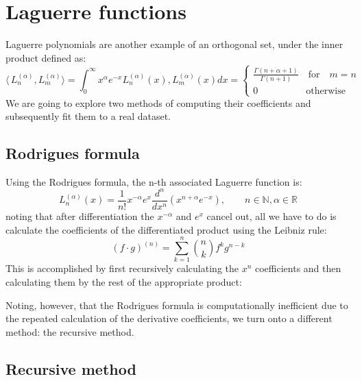 \documentclass[a4paper]{article}
\numberwithin{equation}{section}
\begin{document}
\section{Laguerre functions}

Laguerre polynomials are another example of an orthogonal set, under the inner product defined as:
\begin{equation} \label{laguerre_inner_product}
\langle\,L_n^{(\alpha)}, L_m^{(\alpha)}\rangle=\int_{0}^{\infty} x^{\alpha} e^{-x} L_n^{(\alpha)}(x), L_m^{(\alpha)}(x)dx = 
\begin{cases} 
      \frac{\Gamma(n+\alpha+1)}{\Gamma(n+1)} \quad \textrm{for} \quad m = n \\
      0 \quad \quad \quad \quad \quad \textrm{otherwise}
\end{cases}
\end{equation}
We are going to explore two methods of computing their coefficients and subsequently fit them to a real dataset.

\subsection{Rodrigues formula}

Using the Rodrigues formula, the n-th associated Laguerre function is:
\begin{equation}
L_n^{(\alpha)}(x)=\frac{1}{n!}x^{-\alpha}e^x\frac{d^n}{dx^n}(x^{n+\alpha}e^{-x}), \quad\quad n \in \mathbb{N}, \alpha \in \mathbb{R}
\end{equation}
noting that after differentiation the $x^{-\alpha}$ and ${e^x}$ cancel out, all we have to do is calculate the coefficients of the differentiated product using the Leibniz rule:
\begin{equation}
(f \cdot g)^{(n)} = \sum_{k=1}^{n} \binom{n}{k} f^k g^{n-k}
\end{equation}
This is accomplished by first recursively calculating the $x^n$ coefficients and then calculating them by the rest of the appropriate product:



\noindent Noting, however, that the Rodrigues formula is computationally inefficient due to the repeated calculation of the derivative coefficients, we turn onto a different method: the recursive method.

\subsection{Recursive method}
\end{document}
